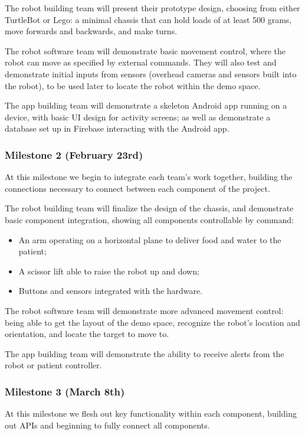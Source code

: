 \documentclass{article}
\begin{document}
The robot building team will present their prototype design, choosing from either TurtleBot or Lego: a minimal chassis that can hold loads of at least 500 grams, move forwards and backwards, and make turns.

The robot software team will demonstrate basic movement control, where the robot can move as specified by external commands. They will also test and demonstrate initial inputs from sensors (overhead cameras and sensors built into the robot), to be used later to locate the robot within the demo space.

The app building team will demonstrate a skeleton Android app running on a device, with basic UI design for activity screens; as well as demonstrate a database set up in Firebase interacting with the Android app. 

\subsubsection{Milestone 2 (February 23rd)}
At this milestone we begin to integrate each team's work together, building the connections necessary to connect between each component of the project. 

The robot building team will finalize the design of the chassis, and demonstrate basic component integration, showing all components controllable by command:
\begin{itemize}
\item An arm operating on a horizontal plane to deliver food and water to the patient;
\item A scissor lift able to raise the robot up and down;
\item Buttons and sensors integrated with the hardware.
\end{itemize}

The robot software team will demonstrate more advanced movement control: being able to get the layout of the demo space, recognize the robot's location and orientation, and locate the target to move to. 

The app building team will demonstrate the ability to receive alerts from the robot or patient controller. 

\subsubsection{Milestone 3 (March 8th)}
At this milestone we flesh out key functionality within each component, building out APIs and beginning to fully connect all components. 
\end{document}
